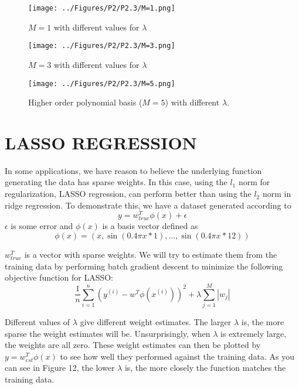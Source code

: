 \documentclass[a4paper,twoside]{article}
\begin{document}
\begin{figure}[h]
  \texttt{[image: ../Figures/P2/P2.3/M=1.png]}
  \caption{$M=1$ with different values for $\lambda$}
  \label{fig:gradient_converging}
\end{figure}
\begin{figure}[h]
  \texttt{[image: ../Figures/P2/P2.3/M=3.png]}
  \caption{$M=3$ with different values for $\lambda$}
  \label{fig:gradient_converging}
\end{figure}
\begin{figure}[h]
  \texttt{[image: ../Figures/P2/P2.3/M=5.png]}
  \caption{Higher order polynomial basis ($M=5$) with different $\lambda$.}
  \label{fig:gradient_converging}
\end{figure}


\section{\uppercase{LASSO Regression}}
In some applications, we have reason to believe the underlying function generating the data has sparse weights. In this case, using the $l_1$ norm for regularization, LASSO regression, can perform better than using the $l_2$ norm in ridge regression. To demonstrate this, we have a dataset generated according to 
\begin{equation}
y = w_{true}^T \phi (x) + \epsilon
\end{equation}
$\epsilon$ is some error and $\phi (x)$ is a basis vector defined as 
\begin{equation}
\phi(x) = (x, \sin(0.4 \pi x * 1), ..., \sin(0.4 \pi x * 12))
\end{equation}

$w_{true}^T$ is a vector with sparse weights. We will try to estimate them from the training data by performing batch gradient descent to minimize the following objective function for LASSO:
\begin{equation}
\frac{1}{n} \sum_{i=1}^{n} (y^{(i)} - w^T \phi(x^{(i)}))^2 + \lambda \sum_{j=1}^{M} |w_j|
\end{equation}

Different values of $\lambda$ give different weight estimates. The larger $\lambda$ is, the more sparse the weight estimates will be. Unsurprisingly, when $\lambda$ is extremely large, the weights are all zero. These weight estimates can then be plotted by $y = w_{est}^T \phi (x)$ to see how well they performed against the training data. As you can see in Figure 12, the lower $\lambda$ is, the more closely the function matches the training data.
\end{document}
